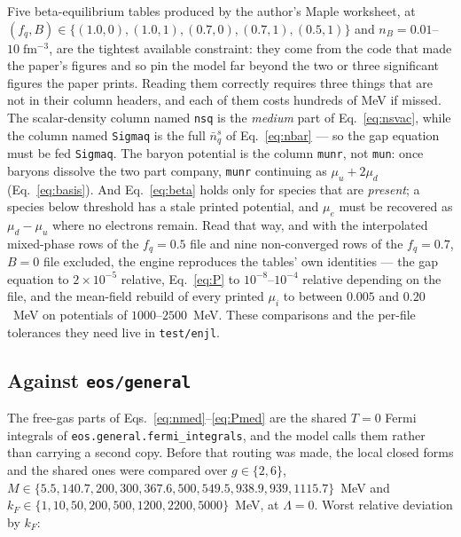 \documentclass[aps,prc,onecolumn,superscriptaddress,nofootinbib,10pt]{revtex4-2}
\newcommand{\nB}{n_B}
\newcommand{\nbs}{\bar{n}^s}
\newcommand{\kF}{k_F}
\begin{document}
Five beta-equilibrium tables produced by the author's Maple worksheet, at
$(f_q, B) \in \{(1.0, 0), (1.0, 1), (0.7, 0), (0.7, 1), (0.5, 1)\}$ and
$\nB = 0.01$--$10\;\mathrm{fm^{-3}}$, are the tightest available constraint:
they come from the code that made the paper's figures and so pin the model far
beyond the two or three significant figures the paper prints. Reading them
correctly requires three things that are not in their column headers, and each
of them costs hundreds of MeV if missed. The scalar-density column named
\texttt{nsq} is the \emph{medium} part of Eq.~\eqref{eq:nsvac}, while the
column named \texttt{Sigmaq} is the full $\nbs_q$ of Eq.~\eqref{eq:nbar} ---
so the gap equation must be fed \texttt{Sigmaq}. The baryon potential is the
column \texttt{munr}, not \texttt{mun}: once baryons dissolve the two part
company, \texttt{munr} continuing as $\mu_u + 2\mu_d$
(Eq.~\ref{eq:basis}). And Eq.~\eqref{eq:beta} holds only for species that are
\emph{present}; a species below threshold has a stale printed potential, and
$\mu_e$ must be recovered as $\mu_d - \mu_u$ where no electrons remain.
Read that way, and with the interpolated mixed-phase rows of the $f_q = 0.5$
file and nine non-converged rows of the $f_q = 0.7$, $B = 0$ file excluded,
the engine reproduces the tables' own identities --- the gap equation to
$2\times10^{-5}$ relative, Eq.~\eqref{eq:P} to $10^{-8}$--$10^{-4}$ relative
depending on the file, and the mean-field rebuild of every printed $\mu_i$ to
between $0.005$ and $0.20$~MeV on potentials of $1000$--$2500$~MeV. These
comparisons and the per-file tolerances they need live in \texttt{test/enjl}.

\subsection{Against \texttt{eos/general}}

The free-gas parts of Eqs.~\eqref{eq:nmed}--\eqref{eq:Pmed} are the shared
$T = 0$ Fermi integrals of \texttt{eos.general.fermi\_integrals}, and the model
calls them rather than carrying a second copy. Before that routing was made,
the local closed forms and the shared ones were compared over
$g \in \{2, 6\}$, $M \in \{5.5, 140.7, 200, 300, 367.6, 500, 549.5, 938.9,
939, 1115.7\}$~MeV and $\kF \in \{1, 10, 50, 200, 500, 1200, 2200, 5000\}$~MeV,
at $\Lambda = 0$. Worst relative deviation by $\kF$:
\end{document}
